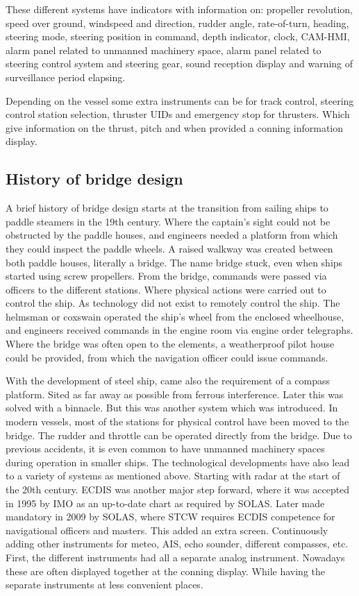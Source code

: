 These different systems have indicators with information on: propeller revolution, speed over ground, windspeed and direction, rudder angle, rate-of-turn, heading, steering mode, steering position in command, depth indicator, clock, \ac{CAM-HMI}, alarm panel related to unmanned machinery space, alarm panel related to steering control system and steering gear, sound reception display and warning of surveillance period elapsing. 

Depending on the vessel some extra instruments can be for track control, steering control station selection, thruster \ac{UID}s and emergency stop for thrusters. Which give information on the thrust, pitch and when provided a conning information display. \cite{DNVGL2017}



\subsection{History of bridge design}
A brief history of bridge design starts at the transition from sailing ships to paddle steamers in the 19th century. Where the captain's sight could not be obstructed by the paddle houses, and engineers needed a platform from which they could inspect the paddle wheels. A raised walkway was created between both paddle houses, literally a bridge. The name bridge stuck, even when ships started using screw propellers. From the bridge, commands were passed via officers to the different stations. Where physical actions were carried out to control the ship. As technology did not exist to remotely control the ship. The helmsman or coxswain operated the ship's wheel from the enclosed wheelhouse, and engineers received commands in the engine room via engine order telegraphs. Where the bridge was often open to the elements, a weatherproof pilot house could be provided, from which the navigation officer could issue commands.

With the development of steel ship, came also the requirement of a compass platform. Sited as far away as possible from ferrous interference. Later this was solved with a binnacle. But this was another system which was introduced. In modern vessels, most of the stations for physical control have been moved to the bridge. The rudder and throttle can be operated directly from the bridge. Due to previous accidents, it is even common to have unmanned machinery spaces during operation in smaller ships. The technological developments have also lead to a variety of systems as mentioned above. Starting with radar at the start of the 20th century. \ac{ECDIS} was another major step forward, where it was accepted in 1995 by IMO as an up-to-date chart as required by \ac{SOLAS}. Later made mandatory in 2009 by \ac{SOLAS}, where \ac{STCW} requires \ac{ECDIS} competence for navigational officers and masters. This added an extra screen. Continuously adding other instruments for meteo, \ac{AIS}, echo sounder, different compasses, etc. First, the different instruments had all a separate analog instrument. Nowadays these are often displayed together at the conning display. While having the separate instruments at less convenient places.

